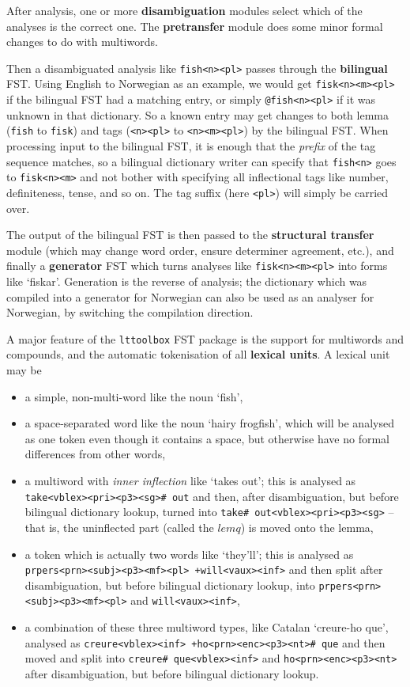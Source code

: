\documentclass[10pt, a4paper]{article}
\newcommand{\ana}[1]{\texttt{#1}}
\newcommand{\f}[1]{`#1'}
\newcommand{\tool}[1]{\texttt{#1}}
\begin{document}
After analysis, one or more \textbf{disambiguation} modules select
which of the analyses is the correct one. The \textbf{pretransfer}
module does some minor formal changes to do with multiwords.

Then a disambiguated analysis like \ana{fish<n><pl>} passes through
the \textbf{bilingual} FST. Using English to Norwegian as an example,
we would get \ana{fisk<n><m><pl>} if the bilingual FST had a matching
entry, or simply \ana{@fish<n><pl>} if it was unknown in that
dictionary. So a known entry may get changes to both lemma (\ana{fish}
to \ana{fisk}) and tags (\ana{<n><pl>} to \ana{<n><m><pl>}) by the
bilingual FST. When processing input to the bilingual FST, it is
enough that the \emph{prefix} of the tag sequence matches, so a
bilingual dictionary writer can specify that \ana{fish<n>} goes to
\ana{fisk<n><m>} and not bother with specifying all inflectional tags
like number, definiteness, tense, and so on. The tag suffix (here
\ana{<pl>}) will simply be carried over.

The output of the bilingual FST is then passed to the
\textbf{structural transfer} module (which may change word order,
ensure determiner agreement, etc.), and finally a \textbf{generator}
FST which turns analyses like \ana{fisk<n><m><pl>} into forms like
\f{fiskar}. Generation is the reverse of analysis; the dictionary
which was compiled into a generator for Norwegian can also be used as
an analyser for Norwegian, by switching the compilation direction.

A major feature of the \tool{lttoolbox} FST package is the support
for multiwords and compounds, and the automatic tokenisation of all
\textbf{lexical units}. A lexical unit may be
\begin{itemize}
\item a simple, non-multi-word like the noun \f{fish},
\item a space-separated word like the noun \f{hairy frogfish}, which
  will be analysed as one token even though it contains a space, but otherwise have no formal
  differences from other words,
\item a multiword with \emph{inner inflection} like \f{takes out}; this is
  analysed as \ana{take<vblex><pri><p3><sg>\# out} and then, after
  disambiguation, but before bilingual dictionary lookup, turned into
  \ana{take\# out<vblex><pri><p3><sg>} -- that is, the uninflected part
  (called the $lemq$) is moved onto the lemma,
\item a token which is actually two words like \f{they'll}; this is
  analysed as \ana{prpers<prn><subj><p3><mf><pl> +will<vaux><inf>} and
  then split after disambiguation, but before bilingual dictionary
  lookup, into \ana{prpers<prn><subj><p3><mf><pl>} and
  \ana{will<vaux><inf>},
\item a combination of these three multiword types, like Catalan
  \f{creure-ho que}, analysed as \ana{creure<vblex><inf>
    +ho<prn><enc><p3><nt>\# que} and then moved and split into
  \ana{creure\# que<vblex><inf>} and \ana{ho<prn><enc><p3><nt>} after
  disambiguation, but before bilingual dictionary lookup.
\end{itemize}
\end{document}

